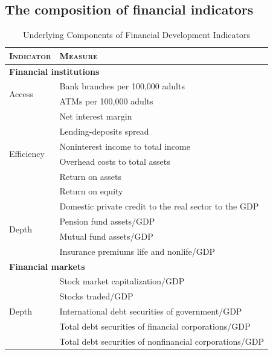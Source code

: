 \documentclass[preprint, nonatbib, 10pt]{elsarticle}
\begin{document}
\subsection*{The composition of financial indicators}
\label{subsec:finind_comp}
\begin{table}[ht!]
    \small
    \caption{Underlying Components of Financial Development Indicators}
    \label{tab:finind}
    \centering
    \begin{tabular}{ll}
      \toprule
      \textsc{Indicator} & \textsc{Measure} \\
      \midrule
      \multicolumn{2}{l}{\textbf{Financial institutions}} \\
      \midrule
      \multirow{2}{*}{Access} 	& Bank branches per 100,000 adults \\
                                  & ATMs per 100,000 adults \\
      \midrule
      \multirow{6}{*}{Efficiency}		& Net interest margin \\
                                  & Lending-deposits spread \\ 
                                  & Noninterest income to total income \\
                                  & Overhead costs to total assets \\
                                  & Return on assets \\
                                  & Return on equity \\
            
      \midrule
      \multirow{4}{*}{Depth}	& Domestic private credit to the real sector to the GDP \\
                                  & Pension fund assets/GDP \\
                                  & Mutual fund assets/GDP \\
                                  & Insurance premiums life and nonlife/GDP \\
      \midrule
      \multicolumn{2}{l}{\textbf{Financial markets}} \\
      \midrule
      \multirow{6}{*}{Depth} 	& Stock market capitalization/GDP \\
                                  & Stocks traded/GDP \\
                                  & International debt securities of government/GDP \\
                                  & Total debt securities of financial corporations/GDP \\
                                  & Total debt securities of nonfinancial corporations/GDP \\
      \bottomrule
    \end{tabular}
\end{table}
\end{document}
